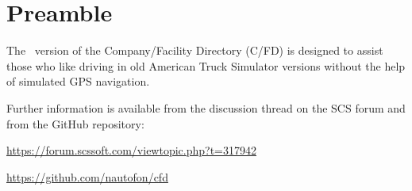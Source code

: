 \maketitle

\vspace{5mm}
\section*{Preamble}

{
\justifying

The \OldVersionNumber\ version of the Company/Facility Directory (C/FD) is designed to assist those who like driving in old American Truck Simulator versions without the help of simulated GPS navigation.

Further information is available from the discussion thread on the SCS forum and from the GitHub repository:

\centering \vspace{1ex}
\url{https://forum.scssoft.com/viewtopic.php?t=317942} \par
\centering \vspace{1ex}
\url{https://github.com/nautofon/cfd} \par
}

\copyrightblock
\thispagestyle{empty}

\tableofcontents
\thispagestyle{empty}
